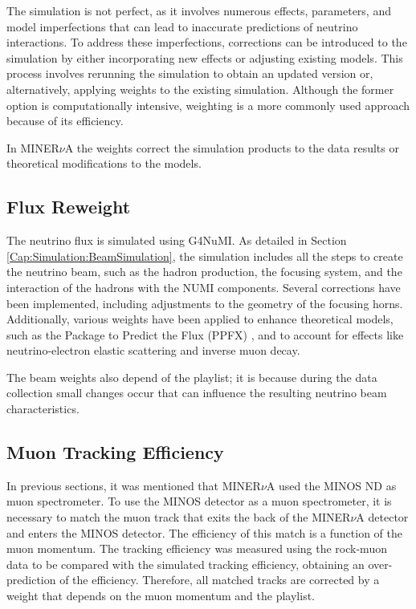 The simulation is not perfect, as it involves numerous effects, parameters, and model imperfections that can lead to inaccurate predictions of neutrino interactions. To address these imperfections, corrections can be introduced to the simulation by either incorporating new effects or adjusting existing models. This process involves rerunning the simulation to obtain an updated version or, alternatively, applying weights to the existing simulation. Although the former option is computationally intensive, weighting is a more commonly used approach because of its efficiency.

In MINER$\nu$A the weights correct the simulation products to the data results or theoretical modifications to the models. 

\subsection{Flux Reweight}
\label{Cap:Simulation:MnvGENIETunes:Flux}
The neutrino flux is simulated using G4NuMI. As detailed in Section \ref{Cap:Simulation:BeamSimulation}, the simulation includes all the steps to create the neutrino beam, such as the hadron production, the focusing system, and the interaction of the hadrons with the NUMI components. Several corrections have been implemented, including adjustments to the geometry of the focusing horns. Additionally, various weights have been applied to enhance theoretical models, such as the Package to Predict the Flux (PPFX) \cite{LeoThesis}, and to account for effects like neutrino-electron elastic scattering and inverse muon decay.

The beam weights also depend of the playlist; it is because during the data collection small changes occur that can influence the resulting neutrino beam characteristics. 

\subsection{Muon Tracking Efficiency}
\label{Cap:Simulation:MnvGENIETunes:MinosEff}
In previous sections, it was mentioned that MINER$\nu$A used the MINOS ND as muon spectrometer. To use the MINOS detector as a muon spectrometer, it is necessary to match the muon track that exits the back of the MINER$\nu$A detector and enters the MINOS detector. The efficiency of this match is a function of the muon momentum. The tracking efficiency was measured using the rock-muon data to be compared with the simulated tracking efficiency, obtaining an over-prediction of the efficiency. Therefore, all matched tracks are corrected by a weight that depends on the muon momentum and the playlist. 

